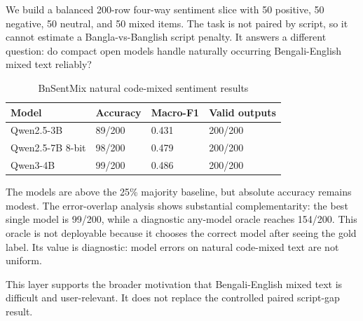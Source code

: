 We build a balanced 200-row four-way sentiment slice with 50 positive, 50 negative, 50 neutral, and 50 mixed items. The task is not paired by script, so it cannot estimate a Bangla-vs-Banglish script penalty. It answers a different question: do compact open models handle naturally occurring Bengali-English mixed text reliably?

\begin{table}[H]
\centering
\caption{BnSentMix natural code-mixed sentiment results}
\label{tab:bnsentmix}
\small
\begin{tabular}{llll}
\hline
Model & Accuracy & Macro-F1 & Valid outputs \\
\hline
Qwen2.5-3B & 89/200 & 0.431 & 200/200 \\
Qwen2.5-7B 8-bit & 98/200 & 0.479 & 200/200 \\
Qwen3-4B & 99/200 & 0.486 & 200/200 \\
\hline
\end{tabular}%
\end{table}

The models are above the 25\% majority baseline, but absolute accuracy remains modest. The error-overlap analysis shows substantial complementarity: the best single model is 99/200, while a diagnostic any-model oracle reaches 154/200. This oracle is not deployable because it chooses the correct model after seeing the gold label. Its value is diagnostic: model errors on natural code-mixed text are not uniform.

This layer supports the broader motivation that Bengali-English mixed text is difficult and user-relevant. It does not replace the controlled paired script-gap result.

\endinput
